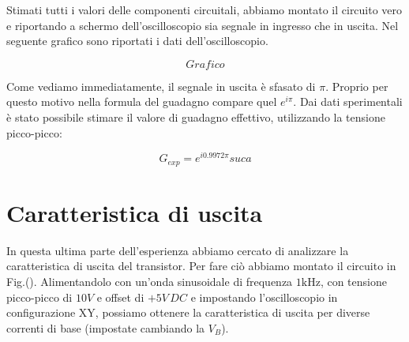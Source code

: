 Stimati tutti i valori delle componenti circuitali, abbiamo montato il circuito vero e riportando a schermo dell'oscilloscopio sia segnale in ingresso che in uscita. Nel seguente grafico sono riportati i dati dell'oscilloscopio.

$$Grafico$$

Come vediamo immediatamente, il segnale in uscita è sfasato di $\pi$. Proprio per questo motivo nella formula del guadagno compare quel $e^{i\pi}$. Dai dati sperimentali è stato possibile stimare il valore di guadagno effettivo, utilizzando la tensione picco-picco:

$$G_{exp}=e^{i 0.9972 \pi} suca$$

\section{Caratteristica di uscita}

In questa ultima parte dell'esperienza abbiamo cercato di analizzare la caratteristica di uscita del transistor. Per fare ciò abbiamo montato il circuito in Fig.(). Alimentandolo con un'onda sinusoidale di frequenza $1\si{\kilo\hertz}$, con tensione picco-picco di $10V$ e offset di $+5V \, DC$ e impostando l'oscilloscopio in configurazione XY, possiamo ottenere la caratteristica di uscita per diverse correnti di base (impostate cambiando la $V_B$). 